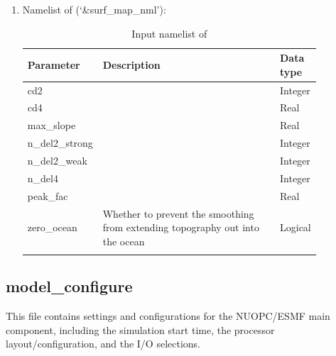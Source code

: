 \documentclass[11pt,fleqn]{report}              %
\begin{document}
\begin{enumerate}
\item Namelist of  (`\&surf\_map\_nml'):
{
\scriptsize
\begin{longtable}{p{0.12\linewidth} | p{0.66\linewidth} | p{0.08\linewidth} }
\hline
\hline
 Parameter & Description & Data type \\
\hline
 cd2 & & Integer \\
 cd4 & & Real \\
 max\_slope & & Real \\
 n\_del2\_strong & & Integer \\
 n\_del2\_weak & & Integer \\
 n\_del4 & & Integer \\
 peak\_fac & & Real \\
 zero\_ocean & Whether to prevent the smoothing from extending topography out into the ocean & Logical \\
\hline
\caption{Input namelist of }
\label{table:fv3_input_nml_surf_map}
\end{longtable}
}

\end{enumerate}



\subsection{model\_configure}
\label{subsec:model_configure}

This file contains settings and configurations for the NUOPC/ESMF main component, including the simulation start time, the processor layout/configuration, and the I/O selections.
\end{document}
